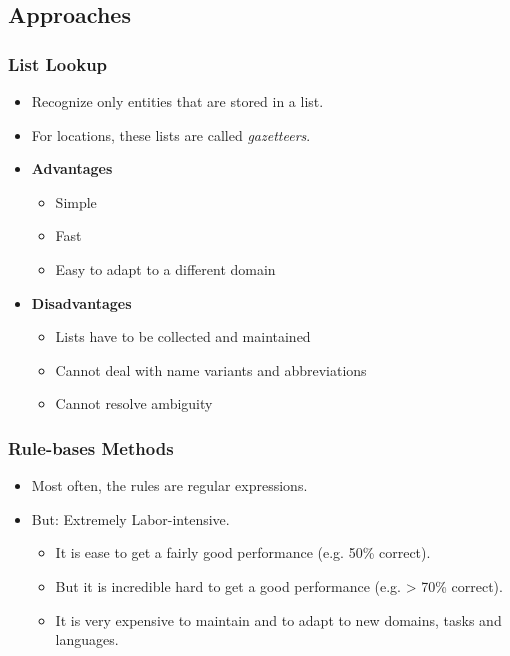 \documentclass[a4paper, 11pt, accentcolor = tud3b]{tudreport}
\begin{document}
            \subsection{Approaches} %
                \subsubsection{List Lookup} %
                    \begin{itemize}
                    	\item Recognize only entities that are stored in a list.
                    	\item For locations, these lists are called \textit{gazetteers}.
                    	\item \textbf{Advantages}
                    		\begin{itemize}
                    			\item Simple
                    			\item Fast
                    			\item Easy to adapt to a different domain
                    		\end{itemize}
                    	\item \textbf{Disadvantages}
                    		\begin{itemize}
                    			\item Lists have to be collected and maintained
                    			\item Cannot deal with name variants and abbreviations
                    			\item Cannot resolve ambiguity
                    		\end{itemize}
                    \end{itemize}

                \subsubsection{Rule-bases Methods} %
                    \begin{itemize}
                    	\item Most often, the rules are regular expressions.
                    	\item But: Extremely Labor-intensive.
                    		\begin{itemize}
                    			\item It is ease to get a fairly good performance (e.g. 50\% correct).
                    			\item But it is incredible hard to get a good performance (e.g. > 70\% correct).
                    			\item It is very expensive to maintain and to adapt to new domains, tasks and languages.
                    		\end{itemize}
                    \end{itemize}
\end{document}
